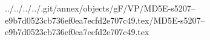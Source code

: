 ../../../../.git/annex/objects/gF/VP/MD5E-s5207--e9b7d0523cb736ef0ea7ecfd2e707c49.tex/MD5E-s5207--e9b7d0523cb736ef0ea7ecfd2e707c49.tex